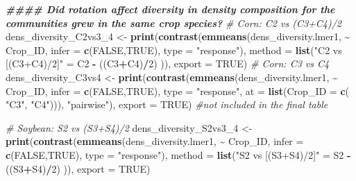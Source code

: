 \documentclass[
]{article}
\newenvironment{Shaded}{\begin{snugshade}}{\end{snugshade}}
\newcommand{\AttributeTok}[1]{\textcolor[rgb]{0.13,0.29,0.53}{#1}}
\newcommand{\CommentTok}[1]{\textcolor[rgb]{0.56,0.35,0.01}{\textit{#1}}}
\newcommand{\ConstantTok}[1]{\textcolor[rgb]{0.56,0.35,0.01}{#1}}
\newcommand{\DecValTok}[1]{\textcolor[rgb]{0.00,0.00,0.81}{#1}}
\newcommand{\DocumentationTok}[1]{\textcolor[rgb]{0.56,0.35,0.01}{\textbf{\textit{#1}}}}
\newcommand{\FunctionTok}[1]{\textcolor[rgb]{0.13,0.29,0.53}{\textbf{#1}}}
\newcommand{\NormalTok}[1]{#1}
\newcommand{\OtherTok}[1]{\textcolor[rgb]{0.56,0.35,0.01}{#1}}
\newcommand{\SpecialCharTok}[1]{\textcolor[rgb]{0.81,0.36,0.00}{\textbf{#1}}}
\newcommand{\StringTok}[1]{\textcolor[rgb]{0.31,0.60,0.02}{#1}}
\begin{document}
\begin{Shaded}
\begin{Highlighting}[]
\DocumentationTok{\#\#\#\# Did rotation affect diversity in density composition for the communities grew in the same crop species?  }
\CommentTok{\# Corn: C2 vs (C3+C4)/2 }
\NormalTok{dens\_diversity\_C2vs3\_4 }\OtherTok{\textless{}{-}} \FunctionTok{print}\NormalTok{(}\FunctionTok{contrast}\NormalTok{(}\FunctionTok{emmeans}\NormalTok{(dens\_diversity.lmer1, }\SpecialCharTok{\textasciitilde{}}\NormalTok{ Crop\_ID, }
                                                 \AttributeTok{infer =} \FunctionTok{c}\NormalTok{(}\ConstantTok{FALSE}\NormalTok{,}\ConstantTok{TRUE}\NormalTok{),}
                                                 \AttributeTok{type =} \StringTok{"response"}\NormalTok{),}
                                         \AttributeTok{method =} \FunctionTok{list}\NormalTok{(}\StringTok{"C2 vs [(C3+C4)/2]"} \OtherTok{=}\NormalTok{ C2 }\SpecialCharTok{{-}}\NormalTok{ ((C3}\SpecialCharTok{+}\NormalTok{C4)}\SpecialCharTok{/}\DecValTok{2}\NormalTok{) )),}
                                \AttributeTok{export =} \ConstantTok{TRUE}\NormalTok{)}
\CommentTok{\# Corn: C3 vs C4}
\NormalTok{dens\_diversity\_C3vs4 }\OtherTok{\textless{}{-}} \FunctionTok{print}\NormalTok{(}\FunctionTok{contrast}\NormalTok{(}\FunctionTok{emmeans}\NormalTok{(dens\_diversity.lmer1, }\SpecialCharTok{\textasciitilde{}}\NormalTok{ Crop\_ID,}
                                               \AttributeTok{infer =} \FunctionTok{c}\NormalTok{(}\ConstantTok{FALSE}\NormalTok{,}\ConstantTok{TRUE}\NormalTok{), }
                                               \AttributeTok{type =} \StringTok{"response"}\NormalTok{,}
                                               \AttributeTok{at =} \FunctionTok{list}\NormalTok{(}\AttributeTok{Crop\_ID =} \FunctionTok{c}\NormalTok{( }\StringTok{"C3"}\NormalTok{, }\StringTok{"C4"}\NormalTok{))), }\StringTok{"pairwise"}\NormalTok{),}
                              \AttributeTok{export =} \ConstantTok{TRUE}\NormalTok{) }\CommentTok{\#not included in the final table}


\CommentTok{\# Soybean: S2 vs (S3+S4)/2 }
\NormalTok{dens\_diversity\_S2vs3\_4 }\OtherTok{\textless{}{-}} \FunctionTok{print}\NormalTok{(}\FunctionTok{contrast}\NormalTok{(}\FunctionTok{emmeans}\NormalTok{(dens\_diversity.lmer1, }\SpecialCharTok{\textasciitilde{}}\NormalTok{ Crop\_ID, }
                                                 \AttributeTok{infer =} \FunctionTok{c}\NormalTok{(}\ConstantTok{FALSE}\NormalTok{,}\ConstantTok{TRUE}\NormalTok{), }
                                                 \AttributeTok{type =} \StringTok{"response"}\NormalTok{), }
                                         \AttributeTok{method =} \FunctionTok{list}\NormalTok{(}\StringTok{"S2 vs [(S3+S4)/2]"} \OtherTok{=}\NormalTok{ S2 }\SpecialCharTok{{-}}\NormalTok{ ((S3}\SpecialCharTok{+}\NormalTok{S4)}\SpecialCharTok{/}\DecValTok{2}\NormalTok{) )), }
                                \AttributeTok{export =} \ConstantTok{TRUE}\NormalTok{)}


\end{Highlighting}
\end{Shaded}
\end{document}
